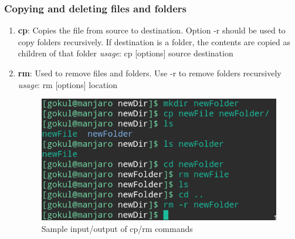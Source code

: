 \documentclass{article}
\begin{document}
\subsubsection{Copying and deleting files and folders}
\begin{enumerate}
    \item {\bf cp}: Copies the file from source to destination. Option -r should be used to copy folders recursively. If destination is a folder, the contents are copied as children of that folder\newline
    \hspace{\parindent} {\em usage}: cp [options] source destination
    
    \item {\bf rm}: Used to remove files and folders. Use -r to remove folders recursively\newline
    \hspace{\parindent} {\em usage}: rm [options] location
    
    \begin{figure}[h!]
        \centering
        \includegraphics[width=.83\textwidth]{img/p1/ss04.png}
        \caption{Sample input/output of cp/rm commands}
    \end{figure}
\end{enumerate}
\end{document}
